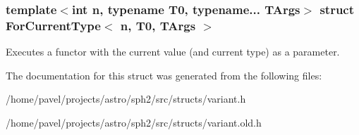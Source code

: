 \subsubsection*{template$<$int n, typename T0, typename... T\+Args$>$\newline
struct For\+Current\+Type$<$ n, T0, T\+Args $>$}

Executes a functor with the current value (and current type) as a parameter. 

The documentation for this struct was generated from the following files\+:\begin{DoxyCompactItemize}
\item 
/home/pavel/projects/astro/sph2/src/structs/variant.\+h\item 
/home/pavel/projects/astro/sph2/src/structs/variant.\+old.\+h\end{DoxyCompactItemize}
